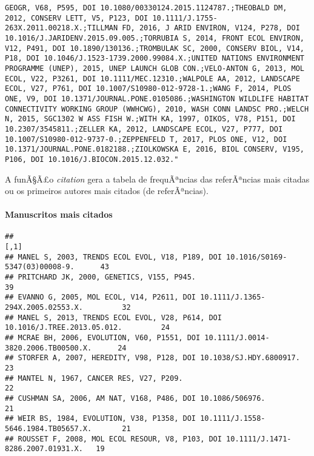 \documentclass[]{article}
\newenvironment{Shaded}{\begin{snugshade}}{\end{snugshade}}
\newcommand{\KeywordTok}[1]{\textcolor[rgb]{0.13,0.29,0.53}{\textbf{#1}}}
\newcommand{\DataTypeTok}[1]{\textcolor[rgb]{0.13,0.29,0.53}{#1}}
\newcommand{\DecValTok}[1]{\textcolor[rgb]{0.00,0.00,0.81}{#1}}
\newcommand{\StringTok}[1]{\textcolor[rgb]{0.31,0.60,0.02}{#1}}
\newcommand{\OperatorTok}[1]{\textcolor[rgb]{0.81,0.36,0.00}{\textbf{#1}}}
\newcommand{\NormalTok}[1]{#1}
\let\oldparagraph\paragraph
\renewcommand{\paragraph}[1]{\oldparagraph{#1}\mbox{}}
\begin{document}
\begin{verbatim}
GEOGR, V68, P595, DOI 10.1080/00330124.2015.1124787.;THEOBALD DM, 2012, CONSERV LETT, V5, P123, DOI 10.1111/J.1755-263X.2011.00218.X.;TILLMAN FD, 2016, J ARID ENVIRON, V124, P278, DOI 10.1016/J.JARIDENV.2015.09.005.;TORRUBIA S, 2014, FRONT ECOL ENVIRON, V12, P491, DOI 10.1890/130136.;TROMBULAK SC, 2000, CONSERV BIOL, V14, P18, DOI 10.1046/J.1523-1739.2000.99084.X.;UNITED NATIONS ENVIRONMENT PROGRAMME (UNEP), 2015, UNEP LAUNCH GLOB CON.;VELO-ANTON G, 2013, MOL ECOL, V22, P3261, DOI 10.1111/MEC.12310.;WALPOLE AA, 2012, LANDSCAPE ECOL, V27, P761, DOI 10.1007/S10980-012-9728-1.;WANG F, 2014, PLOS ONE, V9, DOI 10.1371/JOURNAL.PONE.0105086.;WASHINGTON WILDLIFE HABITAT CONNECTIVITY WORKING GROUP (WWHCWG), 2010, WASH CONN LANDSC PRO.;WELCH N, 2015, SGC1302 W ASS FISH W.;WITH KA, 1997, OIKOS, V78, P151, DOI 10.2307/3545811.;ZELLER KA, 2012, LANDSCAPE ECOL, V27, P777, DOI 10.1007/S10980-012-9737-0.;ZEPPENFELD T, 2017, PLOS ONE, V12, DOI 10.1371/JOURNAL.PONE.0182188.;ZIOLKOWSKA E, 2016, BIOL CONSERV, V195, P106, DOI 10.1016/J.BIOCON.2015.12.032."
\end{verbatim}

A funÃ§Ã£o \emph{citation} gera a tabela de frequÃªncias das
referÃªncias mais citadas ou os primeiros autores mais citados (de
referÃªncias).

\paragraph{Manuscritos mais citados}\label{manuscritos-mais-citados}

\begin{Shaded}
\end{Shaded}

\begin{verbatim}
##                                                                                   [,1]
## MANEL S, 2003, TRENDS ECOL EVOL, V18, P189, DOI 10.1016/S0169-5347(03)00008-9.      43
## PRITCHARD JK, 2000, GENETICS, V155, P945.                                           39
## EVANNO G, 2005, MOL ECOL, V14, P2611, DOI 10.1111/J.1365-294X.2005.02553.X.         32
## MANEL S, 2013, TRENDS ECOL EVOL, V28, P614, DOI 10.1016/J.TREE.2013.05.012.         24
## MCRAE BH, 2006, EVOLUTION, V60, P1551, DOI 10.1111/J.0014-3820.2006.TB00500.X.      24
## STORFER A, 2007, HEREDITY, V98, P128, DOI 10.1038/SJ.HDY.6800917.                   23
## MANTEL N, 1967, CANCER RES, V27, P209.                                              22
## CUSHMAN SA, 2006, AM NAT, V168, P486, DOI 10.1086/506976.                           21
## WEIR BS, 1984, EVOLUTION, V38, P1358, DOI 10.1111/J.1558-5646.1984.TB05657.X.       21
## ROUSSET F, 2008, MOL ECOL RESOUR, V8, P103, DOI 10.1111/J.1471-8286.2007.01931.X.   19
\end{verbatim}
\end{document}
